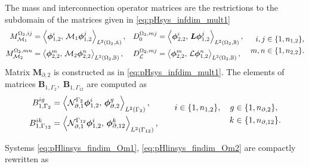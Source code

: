 The mass and interconnection operator matrices are the restrictions to the subdomain of the matrices given in \eqref{eq:pHsys_infdim_mult1}
\begin{equation}
\begin{aligned}
{M}_{\mathcal{M}_1}^{\Omega_2, ij} &= \inner[L^2(\Omega_2, \mathbb{A})]{\bm{\phi}_{1, 2}^i}{\mathcal{M}_1\bm{\phi}_{1, 2}^j}, \\
{M}_{\mathcal{M}_2}^{\Omega_2, mn} &= \inner[L^2(\Omega_2, \mathbb{B})]{\bm{\phi}_{2, 2}^m}{\mathcal{M}_2\bm{\phi}_{2, 2}^n}, 
\end{aligned} \quad 
\begin{aligned}
{D}_{0}^{\Omega_2, mj} &= \inner[L^2(\Omega_2, \mathbb{B})]{\bm{\phi}_{2, 2}^i}{\bm{L}\bm{\phi}_{1, 2}^j}, \\
{D}_{\mathcal{L}}^{\Omega_2, mj} &= \inner[L^2(\Omega_2, \mathbb{B})]{\bm{\phi}_{2, 2}^m}{\mathcal{L}\bm{\phi}_{1, 2}^n}, 
\end{aligned}\quad
\begin{aligned}
i,j &\in \{1,n_{1, 2}\}, \\
m,n &\in \{1,n_{2, 2}\}.
\end{aligned}
\end{equation} 
Matrix $\mathbf{M}_{\partial, 2}$ is constructed as in \eqref{eq:pHsys_infdim_mult1}. The elements of matrices  $\mathbf{B}_{1, \Gamma_2}, \; \mathbf{B}_{1, \Gamma_{12}}$ are computed as
\begin{equation}
\begin{aligned}
{B}_{1, \Gamma_{2}}^{ig} &= \inner[L^2(\Gamma_{2})]{\mathcal{N}_{\partial, 1}^{\Gamma_2}\bm{\phi}_{1, 2}^i}{\bm{\phi}_{\partial, 2}^g},  \\
{B}_{1, \Gamma_{12}}^{ik} &= \inner[L^2(\Gamma_{12})]{\mathcal{N}_{\partial, 1}^{\Gamma_{12}}\bm{\phi}_{1, 2}^i}{\bm{\phi}_{\partial, 12}^k}, 
\end{aligned} \qquad 
\begin{aligned}
i \in \{1,n_{1, 2}\}, \quad g &\in \{1,n_{\partial, 2}\}, \\
k &\in \{1,n_{\partial, 12}\}.
\end{aligned}
\end{equation} 

Systems \eqref{eq:pHlinsys_findim_Om1}, \eqref{eq:pHlinsys_findim_Om2} are compactly rewritten as 


